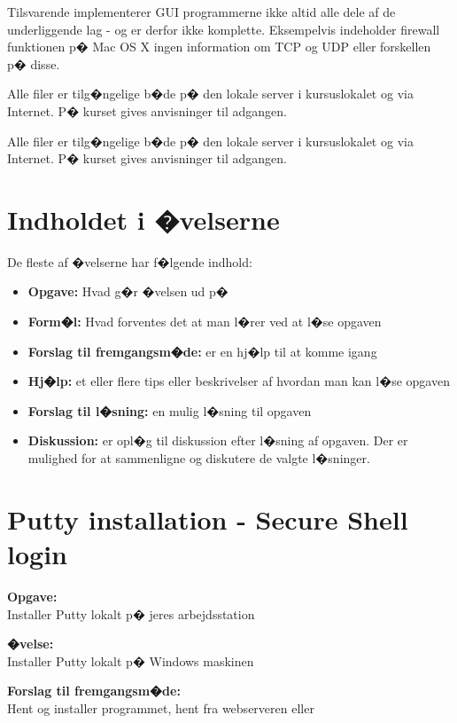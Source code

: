 \documentclass[a4paper,11pt,notitlepage]{oevelser}
\begin{document}
Tilsvarende implementerer GUI programmerne ikke altid alle dele af de
underliggende lag - og er derfor ikke komplette. Eksempelvis
indeholder firewall funktionen p� Mac OS X ingen information om TCP og
UDP eller forskellen p� disse.

Alle filer er tilg�ngelige b�de p� den lokale server i kursuslokalet
og via Internet. P� kurset gives anvisninger til adgangen.


Alle filer er tilg�ngelige b�de p� den lokale server i kursuslokalet
og via Internet. P� kurset gives anvisninger til adgangen.





\chapter*{\color{titlecolor}Indholdet i �velserne}

De fleste af �velserne har f�lgende indhold:
\begin{itemize}
\item {\bfseries Opgave:} Hvad g�r �velsen ud p�
\item {\bfseries Form�l:} Hvad forventes det at man l�rer ved at l�se opgaven
\item {\bfseries Forslag til fremgangsm�de:} er en hj�lp til at komme igang
\item {\bfseries Hj�lp:} et eller flere tips eller beskrivelser af hvordan
  man kan l�se opgaven
\item {\bfseries Forslag til l�sning:} en mulig l�sning til opgaven
\item {\bfseries Diskussion:} er opl�g til diskussion efter l�sning af
  opgaven. Der er mulighed for at sammenligne og diskutere de valgte
  l�sninger.
\end{itemize}


\chapter{Putty installation - Secure Shell login}
\label{ex:putty-install}

{\bfseries Opgave:}\\
Installer Putty lokalt p� jeres arbejdsstation


{\bfseries �velse:}\\
Installer Putty lokalt p� Windows maskinen

{\bfseries Forslag til fremgangsm�de:}\\
Hent og installer programmet, hent fra webserveren eller\\
\end{document}
